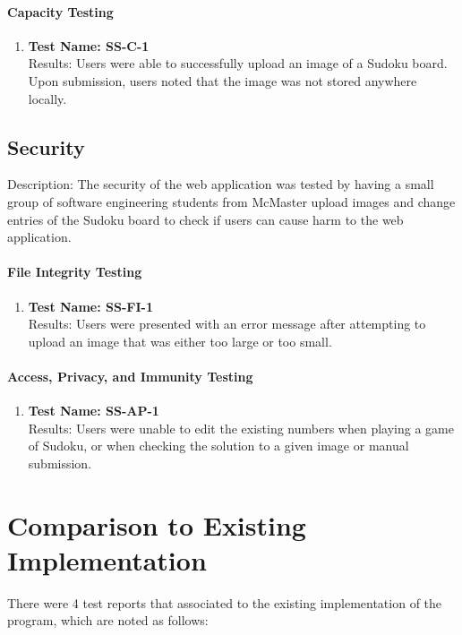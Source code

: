 \documentclass[11pt]{article}
\begin{document}
\paragraph{Capacity Testing}
\begin{enumerate}
    \item \textbf{Test Name: SS-C-1}\\
    Results: Users were able to successfully upload an image of a Sudoku board. Upon submission, users noted that the image was not stored anywhere locally.
\end{enumerate}

\subsection{Security}
Description: The security of the web application was tested by having a small group of software engineering students from McMaster upload images and change entries of the Sudoku board to check if users can cause harm to the web application.

\paragraph{File Integrity Testing}
\begin{enumerate}
    \item \textbf{Test Name: SS-FI-1}\\
    Results: Users were presented with an error message after attempting to upload an image that was either too large or too small.
\end{enumerate}

\paragraph{Access, Privacy, and Immunity Testing}
\begin{enumerate}
    \item \textbf{Test Name: SS-AP-1}\\
    Results: Users were unable to edit the existing numbers when playing a game of Sudoku, or when checking the solution to a given image or manual submission.
\end{enumerate}
	
\section{Comparison to Existing Implementation}	
There were 4 test reports that associated to the existing implementation of the program, which are noted as follows:
\end{document}
